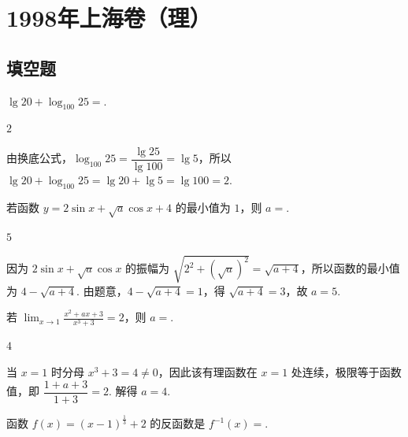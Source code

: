 \documentclass[UTF8,a4paper,oneside,11pt]{ctexbook}
\begin{document}
\mainmatter

\chapter{1998年上海卷（理）}
\section{填空题}

\begin{problem}
\(\lg20 + \log_{100}25 = \)\fillinblank{}.
\end{problem}

\begin{answer}
\(2\)
\end{answer}

\begin{solution}
由换底公式，\(\log_{100}25=\dfrac{\lg25}{\lg100}=\lg5\)，所以 \(\lg20+\log_{100}25=\lg20+\lg5=\lg100=2\).
\end{solution}

\begin{problem}
若函数 \(y = 2\sin x + \sqrt{a} \cos x + 4 \) 的最小值为 \(1\)，则 \(a=\)\fillinblank{}.
\end{problem}

\begin{answer}
\(5\)
\end{answer}

\begin{solution}
因为 \(2\sin x+\sqrt{a}\cos x\) 的振幅为 \(\sqrt{2^2+(\sqrt{a})^2}=\sqrt{a+4}\)，所以函数的最小值为 \(4-\sqrt{a+4}\). 由题意，\(4-\sqrt{a+4}=1\)，得 \(\sqrt{a+4}=3\)，故 \(a=5\).
\end{solution}

\begin{problem}
若 \(\displaystyle\lim_{x\to 1}\frac{x^{2}+ax+3}{x^{3}+3}=2\)，则 \(a=\)\fillinblank{}.
\end{problem}

\begin{answer}
\(4\)
\end{answer}

\begin{solution}
当 \(x=1\) 时分母 \(x^3+3=4\ne0\)，因此该有理函数在 \(x=1\) 处连续，极限等于函数值，即 \(\dfrac{1+a+3}{1+3}=2\). 解得 \(a=4\).
\end{solution}

\begin{problem}
函数 \(f(x)=(x-1)^{\frac{1}{3}}+2 \) 的反函数是 \(f^{-1}(x)= \)\fillinblank{}.
\end{problem}
\end{document}
